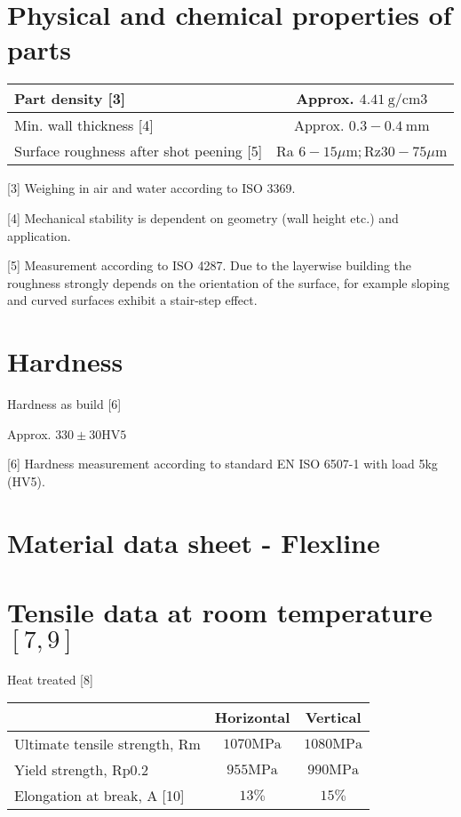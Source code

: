 \documentclass[10pt]{article}
\begin{document}
\section*{Physical and chemical properties of parts}
\begin{center}
\begin{tabular}{lc}
\hline
Part density [3] & Approx. $4.41 \mathrm{~g} / \mathrm{cm} 3$ \\
\hline
Min. wall thickness [4] & Approx. $0.3-0.4 \mathrm{~mm}$ \\
\hline
Surface roughness after shot peening [5] & Ra $6-15 \mu \mathrm{m} ; \mathrm{Rz} 30-75 \mu \mathrm{m}$ \\
\hline
\end{tabular}
\end{center}

[3] Weighing in air and water according to ISO 3369.

[4] Mechanical stability is dependent on geometry (wall height etc.) and application.

[5] Measurement according to ISO 4287. Due to the layerwise building the roughness strongly depends on the orientation of the surface, for example sloping and curved surfaces exhibit a stair-step effect.

\section*{Hardness}
Hardness as build [6]

Approx. $330 \pm 30 \mathrm{HV} 5$

[6] Hardness measurement according to standard EN ISO 6507-1 with load 5kg (HV5).

\section*{Material data sheet - Flexline}
\section*{Tensile data at room temperature $[7,9]$}
Heat treated [8]

\begin{center}
\begin{tabular}{lcc}
\hline
 & Horizontal & Vertical \\
\hline
Ultimate tensile strength, Rm & $1070 \mathrm{MPa}$ & $1080 \mathrm{MPa}$ \\
\hline
Yield strength, Rp0.2 & $955 \mathrm{MPa}$ & $990 \mathrm{MPa}$ \\
\hline
Elongation at break, A [10] & $13 \%$ & $15 \%$ \\
\hline
\end{tabular}
\end{center}
\end{document}
